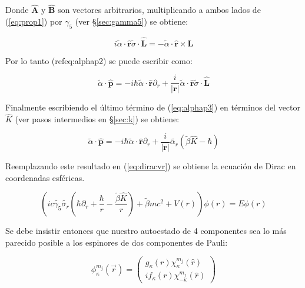 \documentclass[a4paper, 12pt]{article} %
\begin{document}
Donde $\hat{\mathbf{A}}$ y $\hat{\mathbf{B}}$ son vectores arbitrarios, 
multiplicando a ambos lados de (\ref{eq:prop1}) por $\gamma_5$ (ver \S \ref{sec:gamma5}) 
se obtiene:   

\begin{equation}
i\widetilde{\alpha}\cdot\hat{\mathbf{r}}\widetilde{\sigma} \cdot \hat{\mathbf{L}} = -\widetilde{\alpha}\cdot \hat{\mathbf{r}} \times \mathbf{L}
\end{equation}

Por lo tanto (ref{eq:alphap2}) se puede escribir como:

\begin{equation}\label{eq:alphap3}
\widetilde{\alpha}\cdot \mathbf{\hat{p}} = -i\hbar \widetilde{\alpha}\cdot \hat{\mathbf{r}}\partial_r + \dfrac{i}{|\mathbf{r}|}
\widetilde{\alpha}\cdot \hat{\mathbf{r}}\widetilde{\sigma}\cdot \hat{\mathbf{L}}
\end{equation} 

Finalmente escribiendo el \'ultimo t\'ermino de (\ref{eq:alphap3}) en t\'erminos
del vector $\hat{K}$ (ver pasos intermedios en \S \ref{sec:k}) se obtiene:

\begin{equation}\label{alphap4}
\widetilde{\alpha} \cdot \mathbf{\hat{p}} = -i\hbar \widetilde{\alpha}\cdot \hat{\mathbf{r}}\partial_r + \dfrac{i}{|\mathbf{r}|} \widetilde{\alpha_r}(\widetilde{\beta}\hat{K}-\hbar)
\end{equation}

Reemplazando este resultado en (\ref{eq:diracvr}) se obtiene la ecuaci\'on de Dirac en coordenadas esf\'ericas.

\begin{equation}\label{eq:radialdirac}
\left (ic\widetilde{\gamma_5}\widetilde{\sigma_r} \left (\hbar \partial_r + \dfrac{\hbar}{r} -  \dfrac{\widetilde{\beta}\hat{K}}{r}\right )  + \widetilde{\beta} m c^2 + V(r) \right ) \phi(r) = E \phi (r)
\end{equation}

Se debe insistir entonces que nuestro autoestado de 4 componentes sea lo m\'as parecido posible a los espinores de dos componentes de Pauli:

\begin{equation}\label{eq:funciondeonda}
\phi^{m_j}_{\kappa} (\vec{r} ) = \left( \substack{g_{\kappa}(r)\chi^{m_j}_\kappa (\hat{r}) \\ if_\kappa(r)\chi^{m_j}_{-\kappa} (\hat{r}) } \right) 
\end{equation}
\end{document}
